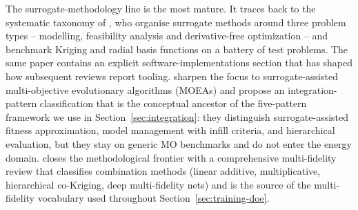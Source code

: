 The surrogate-methodology line is the most mature. It traces back to
the systematic taxonomy of \cite{Bhosekar2018}, who organise surrogate
methods around three problem types -- modelling, feasibility analysis
and derivative-free optimization -- and benchmark Kriging and radial
basis functions on a battery of test problems. The same paper
contains an explicit software-implementations section that has shaped
how subsequent reviews report tooling. \cite{DiazManriquez2016}
sharpen the focus to surrogate-assisted multi-objective evolutionary
algorithms (MOEAs) and propose an integration-pattern classification
that is the conceptual ancestor of the five-pattern framework we use
in Section~\ref{sec:integration}: they distinguish surrogate-assisted
fitness approximation, model management with infill criteria, and
hierarchical evaluation, but they stay on generic MO benchmarks and
do not enter the energy domain. \cite{FernandezGodino2023} closes the
methodological frontier with a comprehensive multi-fidelity review
that classifies combination methods (linear additive, multiplicative,
hierarchical co-Kriging, deep multi-fidelity nets) and is the source
of the multi-fidelity vocabulary used throughout
Section~\ref{sec:training-doe}.

